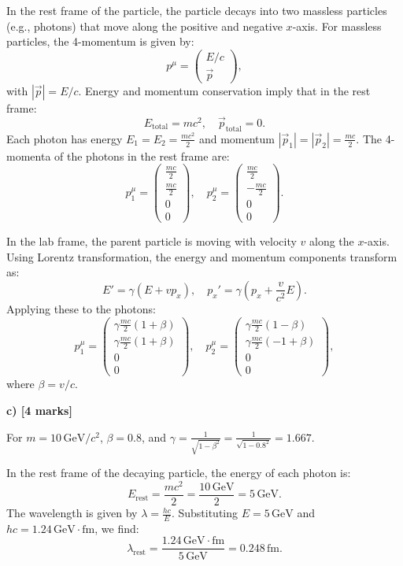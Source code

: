 \documentclass{article}
\begin{document}
In the rest frame of the particle, the particle decays into two massless particles (e.g., photons) that move along the positive and negative \(x\)-axis. For massless particles, the 4-momentum is given by:
\[
p^\mu = \begin{pmatrix} E/c \\ \vec{p} \end{pmatrix},
\]
with \(|\vec{p}| = E/c\). Energy and momentum conservation imply that in the rest frame:
\[
E_{\text{total}} = mc^2, \quad \vec{p}_{\text{total}} = 0.
\]
Each photon has energy \(E_1 = E_2 = \frac{mc^2}{2}\) and momentum \(|\vec{p}_1| = |\vec{p}_2| = \frac{mc}{2}\). The 4-momenta of the photons in the rest frame are:
\[
p_1^\mu = \begin{pmatrix} \frac{mc}{2} \\ \frac{mc}{2} \\ 0 \\ 0 \end{pmatrix}, \quad 
p_2^\mu = \begin{pmatrix} \frac{mc}{2} \\ -\frac{mc}{2} \\ 0 \\ 0 \end{pmatrix}.
\]

In the lab frame, the parent particle is moving with velocity \(v\) along the \(x\)-axis. Using Lorentz transformation, the energy and momentum components transform as:
\[
E' = \gamma (E + vp_x), \quad p_x' = \gamma (p_x + \frac{v}{c^2}E).
\]
Applying these to the photons:
\[
p_1^\mu = \begin{pmatrix} \gamma \frac{mc}{2}(1 + \beta) \\ \gamma \frac{mc}{2}(1 + \beta) \\ 0 \\ 0 \end{pmatrix}, \quad 
p_2^\mu = \begin{pmatrix} \gamma \frac{mc}{2}(1 - \beta) \\ \gamma \frac{mc}{2}(-1 + \beta) \\ 0 \\ 0 \end{pmatrix},
\]
where \(\beta = v/c\).

\textbf{c) [4 marks]}

For \(m = 10 \, \text{GeV}/c^2\), \(\beta = 0.8\), and \(\gamma = \frac{1}{\sqrt{1 - \beta^2}} = \frac{1}{\sqrt{1 - 0.8^2}} = 1.667\).

In the rest frame of the decaying particle, the energy of each photon is:
\[
E_{\text{rest}} = \frac{mc^2}{2} = \frac{10 \, \text{GeV}}{2} = 5 \, \text{GeV}.
\]
The wavelength is given by \(\lambda = \frac{hc}{E}\). Substituting \(E = 5 \, \text{GeV}\) and \(hc = 1.24 \, \text{GeV} \cdot \text{fm}\), we find:
\[
\lambda_{\text{rest}} = \frac{1.24 \, \text{GeV} \cdot \text{fm}}{5 \, \text{GeV}} = 0.248 \, \text{fm}.
\]
\end{document}
